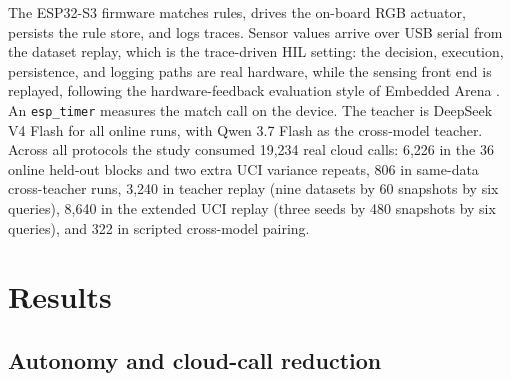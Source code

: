 \documentclass[11pt,a4paper]{article}
\begin{document}
The ESP32-S3 firmware matches rules, drives the on-board RGB actuator,
persists the rule store, and logs traces. Sensor values arrive over USB
serial from the dataset replay, which is the trace-driven HIL setting: the
decision, execution, persistence, and logging paths are real hardware, while
the sensing front end is replayed, following the hardware-feedback evaluation
style of Embedded Arena \cite{31}. An \texttt{esp\_timer} measures the match
call on the device. The teacher is DeepSeek V4 Flash for all online runs,
with Qwen 3.7 Flash as the cross-model teacher. Across all protocols the
study consumed 19,234 real cloud calls: 6,226 in the 36 online held-out
blocks and two extra UCI variance repeats, 806 in same-data cross-teacher
runs, 3,240 in teacher replay (nine
datasets by 60 snapshots by six queries), 8,640 in the extended UCI replay
(three seeds by 480 snapshots by six queries), and 322 in scripted
cross-model pairing.

\section{Results}

\subsection{Autonomy and cloud-call reduction}
\end{document}
